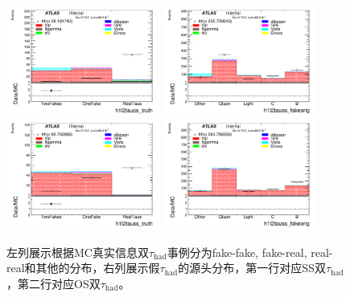 \begin{figure}[htbp]
\centering
\begin{center}
  \includegraphics[width=0.45\textwidth, keepaspectratio]{fig/OneLepTwoTaus/Plots_h1l2tauos_truth_signal.pdf}
  \includegraphics[width=0.45\textwidth, keepaspectratio]{fig/OneLepTwoTaus/Plots_h1l2tauos_fakeorig_signal.pdf}
  \includegraphics[width=0.45\textwidth, keepaspectratio]{fig/OneLepTwoTaus/Plots_h1l2tauss_truth_signal.pdf}
  \includegraphics[width=0.45\textwidth, keepaspectratio]{fig/OneLepTwoTaus/Plots_h1l2tauss_fakeorig_signal.pdf}
\end{center}
\caption{左列展示根据MC真实信息双$\tau_{\text{had}}$事例分为fake-fake, fake-real, real-real和其他的分布，右列展示假$\tau_{\text{had}}$的源头分布，第一行对应SS双$\tau_{\text{had}}$，第二行对应OS双$\tau_{\text{had}}$。}
\label{Fig:1l2tau.truth}
\end{figure}

